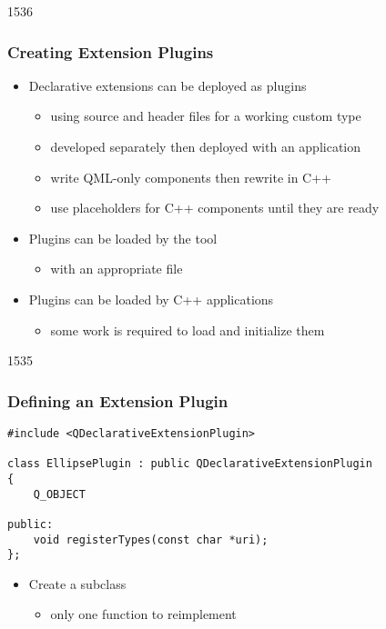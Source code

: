 \begin{slide}{1536}\frametitle{Creating Extension Plugins}

\begin{itemize}
\item Declarative extensions can be deployed as plugins 
  \begin{itemize}
  \item using source and header files for a working custom type
  \item developed separately then deployed with an application
  \item write QML-only components then rewrite in C++
  \item use placeholders for C++ components until they are ready
  \end{itemize}
\vspace*{0.5em}
\item Plugins can be loaded by the  tool
  \begin{itemize}
  \item with an appropriate  file
  \end{itemize}
\vspace*{0.5em}
\item Plugins can be loaded by C++ applications
  \begin{itemize}
  \item some work is required to load and initialize them
  \end{itemize}
\end{itemize}

\end{slide}

\begin{slide}[fragile]{1535}\frametitle{Defining an Extension Plugin}

\begin{lstlisting}
#include <QDeclarativeExtensionPlugin>

class EllipsePlugin : public QDeclarativeExtensionPlugin
{
    Q_OBJECT

public:
    void registerTypes(const char *uri);
};
\end{lstlisting}

\vspace*{0.5em}
\begin{itemize}
\item Create a  subclass
  \begin{itemize}
  \item only one function to reimplement
  \end{itemize}
\end{itemize}

\end{slide}

